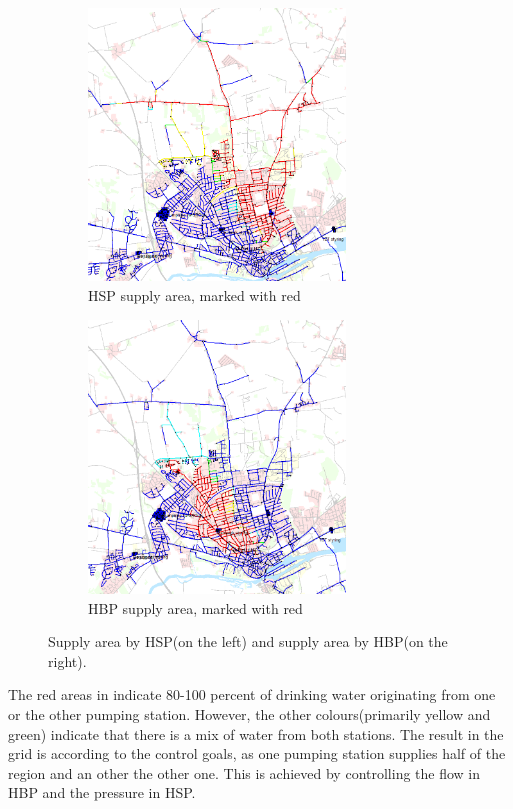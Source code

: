 \begin{figure}[H]
\centering
\begin{subfigure}{.49\textwidth}
\centering
  \includegraphics[width=0.75\textwidth]{report/pictures/HBP_HSP_distribution}
  \caption{HSP supply area, marked with red}
  \label{fig:HSP_HBP_EPA1}
\end{subfigure}
\begin{subfigure}{.49\textwidth}
\centering
  \includegraphics[width=0.75\textwidth]{report/pictures/HBP_HSP_distribution1}
  \caption{HBP supply area, marked with red}
  \label{fig:HSP_HBP_EPA2}
\end{subfigure}
\caption{Supply area by HSP(on the left) and supply area by HBP(on the right)\cite{verdo_doc}.}
\label{fig:HSP_HBP_EPA}
\end{figure}

\vspace{-3mm}

The red areas in  indicate 80-100 percent of drinking water originating from one or the other pumping station. However, the other colours(primarily yellow and green) indicate that there is a mix of water from both stations. The result in the grid is according to the control goals, as one pumping station supplies half of the region and an other the other one. This is achieved by controlling the flow in HBP and the pressure in HSP. 